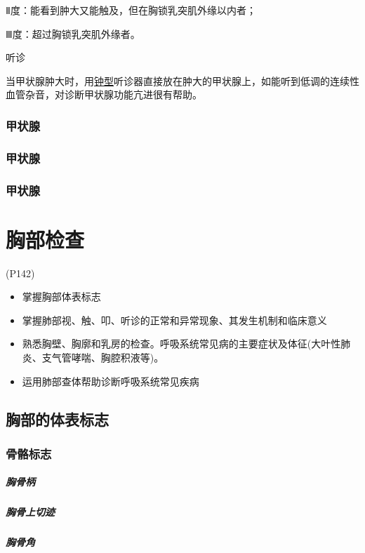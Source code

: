\documentclass[UTF8]{ctexbook}
\begin{document}
Ⅱ度：能看到肿大又能触及，但在胸锁乳突肌外缘以内者；

Ⅲ度：超过胸锁乳突肌外缘者。

听诊

当甲状腺肿大时，用\underline{钟型}听诊器直接放在肿大的甲状腺上，如能听到低调的连续性血管杂音，对诊断甲状腺功能亢进很有帮助。


\subsection{甲状腺}
\subsection{甲状腺}
\subsection{甲状腺}

\chapter{胸部检查}(P142)
\begin{itemize}
    \item 掌握胸部体表标志
    \item 掌握肺部视、触、叩、听诊的正常和异常现象、其发生机制和临床意义
    \item 熟悉胸壁、胸廓和乳房的检查。呼吸系统常见病的主要症状及体征(大叶性肺炎、支气管哮喘、胸腔积液等)。
    \item 运用肺部查体帮助诊断呼吸系统常见疾病
\end{itemize}

\section{胸部的体表标志}
\subsection{骨骼标志}
\paragraph{胸骨柄}
\paragraph{胸骨上切迹}
\paragraph{胸骨角}
\end{document}
